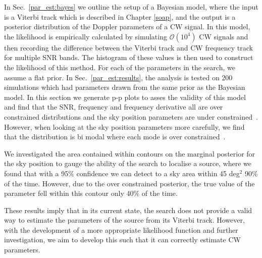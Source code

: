 In Sec.~\ref{par_est:bayes} we outline the setup of a Bayesian model,
where the input is a Viterbi track which is described in Chapter \ref{soap}, and the output is a posterior distribution of
the Doppler parameters of a \gls{CW} signal.  In this model, the likelihood is
empirically calculated by simulating $\mathcal{O}(10^4)$ \gls{CW} signals and
then recording the difference between the Viterbi track and \gls{CW} frequency
track for multiple \gls{SNR} bands.  The histogram of these values is
then used to construct the likelihood of this method.  For each of the
parameters in the search, we assume a flat prior.  In
Sec.~\ref{par_est:results}, the analysis is tested on 200 simulations which had
parameters drawn from the same prior as the Bayesian model.  In this section we
generate p-p plots to asses the validity of this model and find that the
\gls{SNR}, frequency and frequency derivative all are over constrained
distributions and the sky position parameters are under constrained~. However, when
looking at the sky position parameters more carefully, we find that the
distribution is bi modal where each mode is over constrained~.

We investigated the area contained within contours on the marginal posterior
for the sky position to gauge the ability of the search to localise a source,
where we found that with a 95\% confidence we can detect to a sky area within
45 deg$^2$ 90\% of the time.  However, due to the over constrained posterior,
the true value of the parameter fell within this contour only 40\% of the
time.~

These results imply that in its current state, the search does not provide a
valid way to estimate the parameters of the source from its Viterbi track.
However, with the development of a more appropriate likelihood function and
further investigation, we aim to develop this such that it can correctly
estimate \gls{CW} parameters.



















